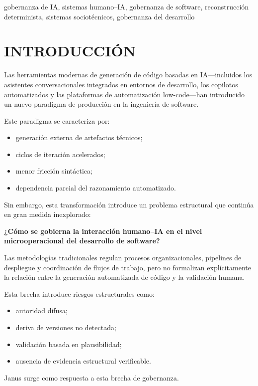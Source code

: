 \documentclass[conference]{IEEEtran}
\begin{document}
\begin{IEEEkeywords}
gobernanza de IA, sistemas humano--IA, gobernanza de software, reconstrucción determinista, sistemas sociotécnicos, gobernanza del desarrollo
\end{IEEEkeywords}

\section{INTRODUCCIÓN}
Las herramientas modernas de generación de código basadas en IA---incluidos los asistentes conversacionales integrados en entornos de desarrollo, los copilotos automatizados y las plataformas de automatización low-code---han introducido un nuevo paradigma de producción en la ingeniería de software.

Este paradigma se caracteriza por:
\begin{itemize}
  \item generación externa de artefactos técnicos;
  \item ciclos de iteración acelerados;
  \item menor fricción sintáctica;
  \item dependencia parcial del razonamiento automatizado.
\end{itemize}

Sin embargo, esta transformación introduce un problema estructural que continúa en gran medida inexplorado:

\textbf{¿Cómo se gobierna la interacción humano--IA en el nivel microoperacional del desarrollo de software?}

Las metodologías tradicionales regulan procesos organizacionales, pipelines de despliegue y coordinación de flujos de trabajo, pero no formalizan explícitamente la relación entre la generación automatizada de código y la validación humana.

Esta brecha introduce riesgos estructurales como:
\begin{itemize}
  \item autoridad difusa;
  \item deriva de versiones no detectada;
  \item validación basada en plausibilidad;
  \item ausencia de evidencia estructural verificable.
\end{itemize}

Janus surge como respuesta a esta brecha de gobernanza.
\end{document}
